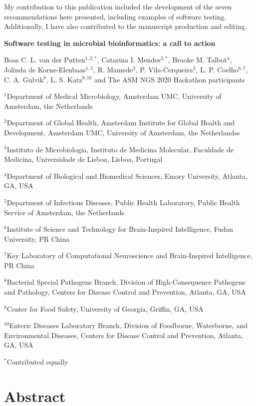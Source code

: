 My contribution to this publication included the development of the seven recommendations here presented, including examples of software testing. Additionally, I have also contributed to the manuscript production and
editing.




\cleardoublepage 

\begin{center}
\large
\textbf{Software testing in microbial bioinformatics: a call to action}
\end{center}

Boas C. L. van der Putten$^{1,2,*}$, 
Catarina I. Mendes$^{3,*}$,
Brooke M. Talbot$^{4}$, 
Jolinda de Korne-Elenbaas$^{1,5}$, 
R. Mamede$^{3}$, 
P. Vila-Cerqueira$^{3}$, 
L. P. Coelho$^{6,7}$, 
C. A. Gulvik$^{8}$, 
L. S. Katz$^{9,10}$ and The ASM NGS 2020 Hackathon participants

$^1$Department of Medical Microbiology, Amsterdam UMC, University of Amsterdam, the Netherlands

$^2$Department of Global Health, Amsterdam Institute for Global Health and Development, Amsterdam UMC, University of Amsterdam, the Netherlandss

$^3$Instituto de Microbiologia, Instituto de Medicina Molecular, Faculdade de Medicina, Universidade de Lisboa, Lisboa, Portugal 

$^4$Department of Biological and Biomedical Sciences, Emory University, Atlanta, GA, USA

$^5$Department of Infectious Diseases, Public Health Laboratory, Public Health Service of Amsterdam, the Netherlands

$^6$Institute of Science and Technology for Brain-Inspired Intelligence, Fudan University, PR China

$^7$Key Laboratory of Computational Neuroscience and Brain-Inspired Intelligence, PR China

$^8$Bacterial Special Pathogens Branch, Division of High-Consequence Pathogens and Pathology, Centers for Disease Control and Prevention, Atlanta, GA, USA

$^9$Center for Food Safety, University of Georgia, Griffin, GA, USA

$^{10}$Enteric Diseases Laboratory Branch, Division of Foodborne, Waterborne, and Environmental Diseases, Centers for Disease Control and Prevention, Atlanta, GA, USA

$^*$Contributed equally

\section{Abstract} \label{sec:ch8_abstract}

